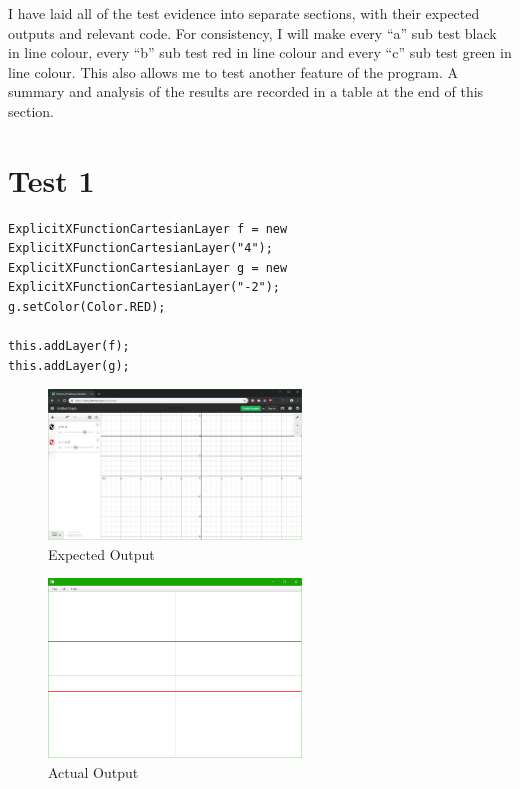 \documentclass[../../../main.tex]{subfiles}
\begin{document}
I have laid all of the test evidence into separate sections, with their expected outputs and relevant code. For consistency, I will make every ``a'' sub test black in line colour,  every ``b'' sub test red in line colour and  every ``c'' sub test green in line colour. This also allows me to test another feature of the program. A summary and analysis of the results are recorded in a table at the end of this section.
\newpage
\section{Test 1}
\begin{verbatim}
ExplicitXFunctionCartesianLayer f = new ExplicitXFunctionCartesianLayer("4");
ExplicitXFunctionCartesianLayer g = new ExplicitXFunctionCartesianLayer("-2");
g.setColor(Color.RED);

this.addLayer(f);
this.addLayer(g);
\end{verbatim}

\begin{figure}[H]
	\centering
	\includegraphics[width=0.6\textwidth]{tests/expected1}
	\caption{Expected Output}
\end{figure}

\begin{figure}[H]
	\centering
	\includegraphics[width=0.6\textwidth]{tests/actual1}
	\caption{Actual Output}
\end{figure}
\newpage
\end{document}
